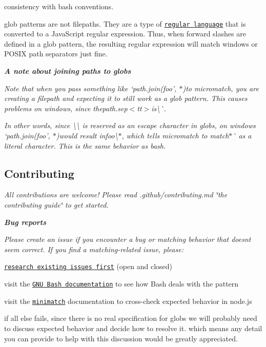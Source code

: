 {\itshape 
\begin{DoxyItemize}
\item consistency with bash conventions.
\item glob patterns are not filepaths. They are a type of \href{https://en.wikipedia.org/wiki/Regular_language}{\tt regular language} that is converted to a Java\+Script regular expression. Thus, when forward slashes are defined in a glob pattern, the resulting regular expression will match windows or P\+O\+S\+IX path separators just fine.
\end{DoxyItemize}}

{\itshape {\bfseries A note about joining paths to globs}}

{\itshape Note that when you pass something like `path.\+join(\textquotesingle{}foo', \textquotesingle{}$\ast$\textquotesingle{}){\ttfamily to micromatch, you are creating a filepath and expecting it to still work as a glob pattern. This causes problems on windows, since the}path.\+sep$<$tt$>$is\textbackslash{}\`{}.}

{\itshape In other words, since {\ttfamily \textbackslash{}\textbackslash{}} is reserved as an escape character in globs, on windows `path.\+join(\textquotesingle{}foo', \textquotesingle{}$\ast$\textquotesingle{}){\ttfamily would result in}foo\textbackslash{}$\ast${\ttfamily , which tells micromatch to match}$\ast$\`{} as a literal character. This is the same behavior as bash.}

{\itshape \subsection*{Contributing}}

{\itshape }

{\itshape All contributions are welcome! Please read .github/contributing.\+md \char`\"{}the contributing guide\char`\"{} to get started.}

{\itshape {\bfseries Bug reports}}

{\itshape Please create an issue if you encounter a bug or matching behavior that doesn\textquotesingle{}t seem correct. If you find a matching-\/related issue, please\+:}

{\itshape 
\begin{DoxyItemize}
\item \href{../../issues}{\tt research existing issues first} (open and closed)
\item visit the \href{https://www.gnu.org/software/bash/manual/}{\tt G\+NU Bash documentation} to see how Bash deals with the pattern
\item visit the \href{https://github.com/isaacs/minimatch}{\tt minimatch} documentation to cross-\/check expected behavior in node.\+js
\item if all else fails, since there is no real specification for globs we will probably need to discuss expected behavior and decide how to resolve it. which means any detail you can provide to help with this discussion would be greatly appreciated.
\end{DoxyItemize}}

